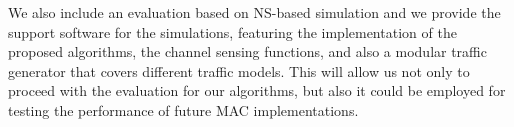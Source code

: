 
We also include an evaluation based on \acs{NS}-based simulation and we provide the support software for the simulations, featuring the implementation of the proposed algorithms, the channel sensing functions, and also a modular traffic generator that covers different traffic models. This will allow us not only to proceed with the evaluation for our algorithms, but also it could be employed for testing the performance of future \acs{MAC} implementations.
